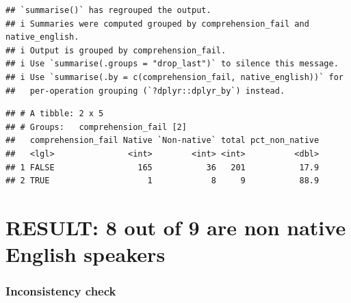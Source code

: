 \documentclass[
]{article}
\begin{document}
\begin{verbatim}
## `summarise()` has regrouped the output.
## i Summaries were computed grouped by comprehension_fail and native_english.
## i Output is grouped by comprehension_fail.
## i Use `summarise(.groups = "drop_last")` to silence this message.
## i Use `summarise(.by = c(comprehension_fail, native_english))` for
##   per-operation grouping (`?dplyr::dplyr_by`) instead.
\end{verbatim}

\begin{verbatim}
## # A tibble: 2 x 5
## # Groups:   comprehension_fail [2]
##   comprehension_fail Native `Non-native` total pct_non_native
##   <lgl>               <int>        <int> <int>          <dbl>
## 1 FALSE                 165           36   201           17.9
## 2 TRUE                    1            8     9           88.9
\end{verbatim}

\section{RESULT: 8 out of 9 are non native English
speakers}\label{result-8-out-of-9-are-non-native-english-speakers}

\subsubsection{Inconsistency check}\label{inconsistency-check}
\end{document}

